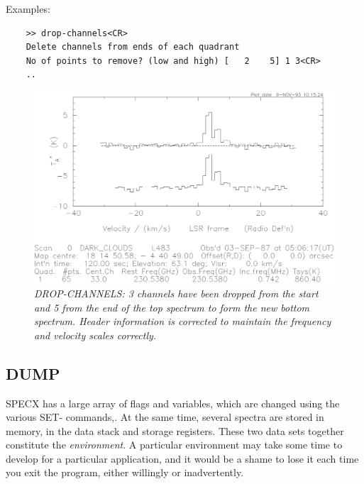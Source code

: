 \documentclass[11pt,twoside]{report}
\begin{document}
Examples:
\begin{verbatim}
    >> drop-channels<CR>
    Delete channels from ends of each quadrant
    No of points to remove? (low and high) [   2    5] 1 3<CR>
    ..
\end{verbatim}

\begin{figure}[htbp]
\begin{center}
\includegraphics[scale=0.65]{drop-ch.ps}
\protect\parbox{5.5in}
{\caption[DROP]
{\sl
DROP-CHANNELS: 3 channels have been dropped from the start and 5 from the
end of the top spectrum to form the new bottom spectrum. Header information
is corrected to maintain the frequency and velocity scales correctly.
\label{DROP}
}
}
\end{center}
\end{figure}

\subsection{DUMP} 

SPECX has a large array of flags  and variables, which are changed
using the various SET- commands,. At the same time, several spectra are stored
in memory, in the data stack  and storage registers.
 These two data sets together constitute
the {\em environment}.  A particular environment may take
some time to develop for a particular application, and it would be a shame to
lose it each time you exit the program, either willingly or inadvertently.
\end{document}
